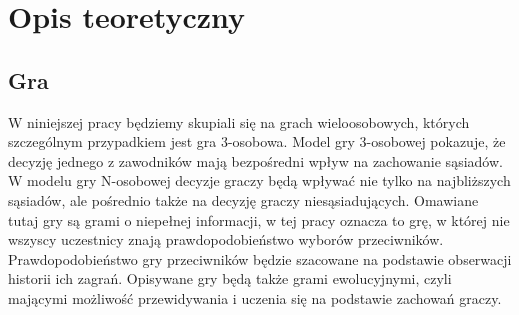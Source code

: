 \chapter{Opis teoretyczny}
\label{cha:opis_teor}

\section{Gra}
\label{sec:gra}
W niniejszej pracy będziemy skupiali się na grach wieloosobowych, których szczególnym przypadkiem jest gra 3-osobowa. Model gry 3-osobowej pokazuje, że decyzję jednego z zawodników mają bezpośredni wpływ na zachowanie sąsiadów. W modelu gry N-osobowej decyzje graczy będą wpływać nie tylko na najbliższych sąsiadów, ale pośrednio także na decyzję graczy niesąsiadujących.
Omawiane tutaj gry są grami o niepełnej informacji, w tej pracy oznacza to grę, w której nie wszyscy uczestnicy znają prawdopodobieństwo wyborów przeciwników. Prawdopodobieństwo gry przeciwników będzie szacowane na podstawie obserwacji historii ich zagrań.
Opisywane gry będą także grami ewolucyjnymi, czyli mającymi możliwość przewidywania i uczenia się na podstawie zachowań graczy.

